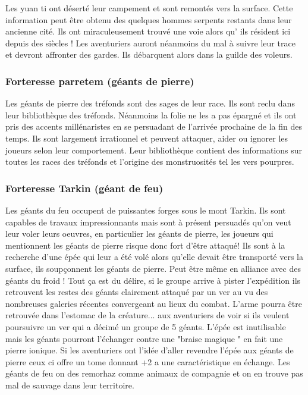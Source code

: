 Les yuan ti ont déserté leur campement et sont remontés vers la surface. Cette information peut être obtenu des quelques hommes serpents restants dans leur ancienne cité. Ils ont miraculeusement trouvé une voie alors qu' ils résident ici depuis des siècles ! Les aventuriers auront néanmoins du mal à suivre leur trace et devront affronter des gardes. Ils débarquent alors dans la guilde des voleurs. 

\subsubsection*{Forteresse parretem (géants de pierre)}

Les géants de pierre des tréfonds sont des sages de leur race. Ils sont reclu dans leur bibliothèque des tréfonds. Néanmoins la folie ne les a pas épargné et ils ont pris des accents millénaristes en se persuadant de l'arrivée prochaine de la fin des temps. Ils sont largement irrationnel et peuvent attaquer, aider ou ignorer les joueurs selon leur comportement. Leur bibliothèque contient des informations sur toutes les races des tréfonds et l'origine des monstruosités tel les vers pourpres. 

\subsubsection*{Forteresse Tarkin (géant de feu)}

Les géants du feu occupent de puissantes forges sous le mont Tarkin. Ils sont capables de travaux impressionnants mais sont à présent persuadés qu'on veut leur voler leurs oeuvres, en particulier les géants de pierre, les joueurs qui mentionnent les géants de pierre risque donc fort d'être attaqué! Ils sont à la recherche d'une épée qui leur a été volé alors qu'elle devait être transporté vers la surface, ils soupçonnent les géants de pierre. Peut être même en alliance avec des géants du froid ! Tout ça est du délire, si le groupe arrive à pister l'expédition ils retrouvent les restes des géants clairement attaqué par un ver au vu des nombreuses galeries récentes convergeant au lieux du combat. L'arme pourra être retrouvée dans l'estomac de la créature... aux aventuriers de voir si ils veulent poursuivre un ver qui a décimé un groupe de 5 géants. L'épée est inutilisable mais les géants pourront l'échanger contre une "braise magique " en fait une pierre ionique. Si les aventuriers ont l'idée d'aller revendre l'épée aux géants de pierre ceux ci offre un tome donnant +2 a une caractéristique en échange. Les géants de feu on des remorhaz comme animaux de compagnie et on en trouve pas mal de sauvage dans leur territoire. 

